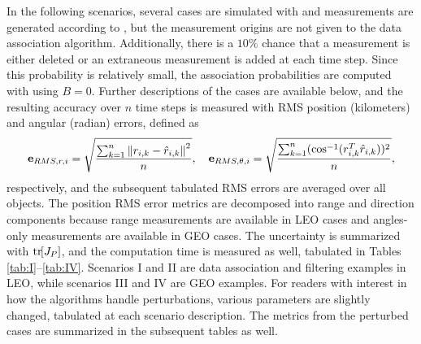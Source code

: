 In the following scenarios, several cases are simulated with  and measurements are generated according to , but the measurement origins are not given to the data association algorithm.
Additionally, there is a $10\%$ chance that a measurement is either deleted or an extraneous measurement is added at each time step.
Since this probability is relatively small, the association probabilities are computed with  using $B=0$.
Further descriptions of the cases are available below, and the resulting accuracy over $n$ time steps is measured with RMS position (kilometers) and angular (radian) errors, defined as
\begin{align}
\mathbf{e}_{RMS,r,i}=\sqrt{\frac{\sum_{k=1}^n\left\| r_{i,k}-\hat r_{i,k} \right\|^2}{n}}
, \quad
\mathbf{e}_{RMS,\theta,i}=\sqrt{\frac{\sum_{k=1}^n(\cos^{-1}(r_{i,k}^T\hat r_{i,k}))^2}{n}}
,
\end{align}
respectively, and the subsequent tabulated RMS errors are averaged over all objects. 
The position RMS error metrics are decomposed into range and direction components because range measurements are available in LEO cases and angles-only measurements are available in GEO cases.
The uncertainty is summarized with $\mathrm{tr}\negthickspace\left[ J_P \right]$, and the computation time is measured as well, tabulated in Tables \ref{tab:I}--\ref{tab:IV}.
Scenarios I and II are data association and filtering examples in LEO, while scenarios III and IV are GEO examples.
For readers with interest in how the algorithms handle perturbations, various parameters are slightly changed, tabulated at each scenario description.
The metrics from the perturbed cases are summarized in the subsequent tables as well.


